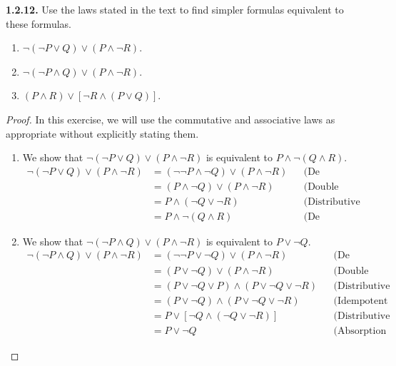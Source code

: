 \documentclass[12pt]{amsart}
\newenvironment{statement}[1]{\smallskip\noindent\color[rgb]{.6627, .3529, .6314} {\bf #1.}}{}
\theoremstyle{definition}
\theoremstyle{remark}
\begin{document}
\begin{statement}{1.2.12}
Use the laws stated in the text to find simpler formulas equivalent to these formulas.
\begin{enumerate}
	\item $\neg (\neg P \vee Q) \vee (P \wedge \neg R)$.
	\item $\neg (\neg P \wedge Q) \vee (P \wedge \neg R)$.
	\item $(P \wedge R) \vee [\neg R \wedge (P \vee Q)]$.
\end{enumerate}
\end{statement}

\begin{proof}
In this exercise, we will use the commutative and associative laws as appropriate without explicitly stating them.
\begin{enumerate}
	\item We show that $\neg (\neg P \vee Q) \vee (P \wedge \neg R)$ is equivalent to $P \wedge \neg (Q \wedge R)$.
	\begin{align*}
		\neg (\neg P \vee Q) \vee (P \wedge \neg R)
		&= (\neg \neg P \wedge \neg Q) \vee (P \wedge \neg R) && \text{(De Morgan's law)} \\
		&= (P \wedge \neg Q) \vee (P \wedge \neg R) && \text{(Double negative law)} \\
		&= P \wedge (\neg Q \vee \neg R) && \text{(Distributive law)} \\
		&= P \wedge \neg (Q \wedge R) && \text{(De Morgan's law)}
	\end{align*}
	
	\item We show that $\neg (\neg P \wedge Q) \vee (P \wedge \neg R)$ is equivalent to $P \vee \neg Q$.
	\begin{align*}
		\neg (\neg P \wedge Q) \vee (P \wedge \neg R)
		&= (\neg \neg P \vee \neg Q) \vee (P \wedge \neg R) && \text{(De Morgan's law)} \\
		&= (P \vee \neg Q) \vee (P \wedge \neg R) && \text{(Double negative law)} \\
		&= (P \vee \neg Q \vee P) \wedge (P \vee \neg Q \vee \neg R)
		&& \text{(Distributive law)} \\
		&= (P \vee \neg Q) \wedge (P \vee \neg Q \vee \neg R) && \text{(Idempotent law)} \\
		&= P \vee [\neg Q \wedge (\neg Q \vee \neg R)] && \text{(Distributive law)} \\
		&= P \vee \neg Q && \text{(Absorption law)}
	\end{align*}
	

\end{enumerate}
\end{proof}
\end{document}
